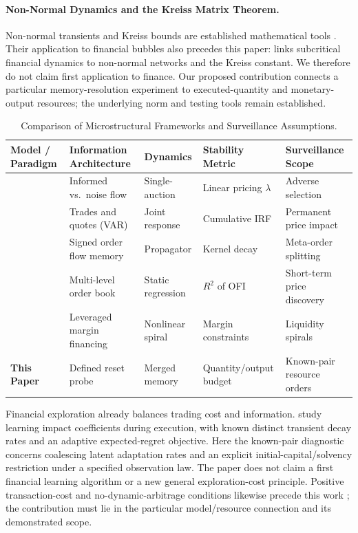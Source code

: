 \documentclass[12pt]{article}
\theoremstyle{definition}
\theoremstyle{remark}
\begin{document}
\paragraph{Non-Normal Dynamics and the Kreiss Matrix Theorem.}
Non-normal transients and Kreiss bounds are established mathematical tools \citep{kreiss1962,spijker1991,trefethen2005spectra}. Their application to financial bubbles also precedes this paper: \citet{sornette2023nonnormal} links subcritical financial dynamics to non-normal networks and the Kreiss constant. We therefore do not claim first application to finance. Our proposed contribution connects a particular memory-resolution experiment to executed-quantity and monetary-output resources; the underlying norm and testing tools remain established.

\begin{table}[htbp]
\centering\footnotesize
\caption{Comparison of Microstructural Frameworks and Surveillance Assumptions.}
\label{tab:lit_comparison}
\begin{tabularx}{\textwidth}{p{3.2cm}Xp{2.2cm}XX}\toprule
Model / Paradigm & Information Architecture & Dynamics & Stability Metric & Surveillance Scope \\\midrule
\citet{kyle1985continuous} & Informed vs.\ noise flow & Single-auction & Linear pricing $\lambda$ & Adverse selection \\
\citet{hasbrouck1991} & Trades and quotes (VAR) & Joint response & Cumulative IRF & Permanent price impact \\
\citet{bouchaud2004fluctuations} & Signed order flow memory & Propagator & Kernel decay & Meta-order splitting \\
\citet{cont2014} & Multi-level order book & Static regression & $R^2$ of OFI & Short-term price discovery \\
\citet{brunnermeier2009} & Leveraged margin financing & Nonlinear spiral & Margin constraints & Liquidity spirals \\
\textbf{This Paper} & Defined reset probe & Merged memory & Quantity/output budget & Known-pair resource orders \\\bottomrule
\end{tabularx}
\end{table}

Financial exploration already balances trading cost and information. \citet{parkvanroy2012} study learning impact coefficients during execution, with known distinct transient decay rates and an adaptive expected-regret objective. Here the known-pair diagnostic concerns coalescing latent adaptation rates and an explicit initial-capital/solvency restriction under a specified observation law. The paper does not claim a first financial learning algorithm or a new general exploration-cost principle. Positive transaction-cost and no-dynamic-arbitrage conditions likewise precede this work \citep{gatheral2010,schneiderlillo2017}; the contribution must lie in the particular model/resource connection and its demonstrated scope.
\end{document}
